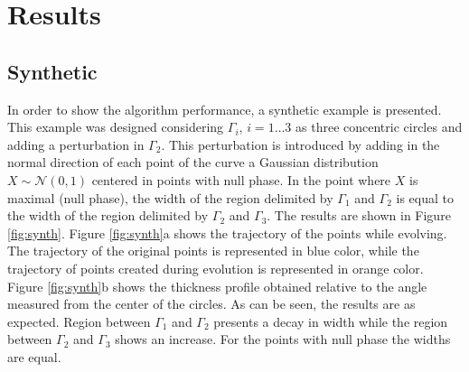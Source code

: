 \documentclass{article}
\begin{document}
\section{Results}
\label{sec:results}

\subsection{Synthetic}
\label{ssec:syn}
In order to show the algorithm performance, a synthetic example is presented. This example was designed considering $\Gamma_i$, $i=1\dots3$ as three concentric circles and adding a perturbation in $\Gamma_2$. This perturbation is introduced by adding in the normal direction of each point of the curve a Gaussian distribution $X \sim \mathcal{N}(0,1)$ centered in points with null phase. In the point where $X$ is maximal (null phase), the width of the region delimited by $\Gamma_1$ and $\Gamma_2$ is equal to the width of the region delimited by $\Gamma_2$ and $\Gamma_3$. The results are shown in Figure \ref{fig:synth}. Figure \ref{fig:synth}a shows the trajectory of the points while evolving. The trajectory of the original points is represented in blue color, while the trajectory of points created during evolution is represented in orange color. Figure \ref{fig:synth}b shows the thickness profile obtained relative to the angle measured from the center of the circles. As can be seen, the results are as expected. Region between $\Gamma_1$ and $\Gamma_2$ presents a decay in width while the region between $\Gamma_2$ and $\Gamma_3$ shows an increase. For the points with null phase the widths are equal.
\end{document}
